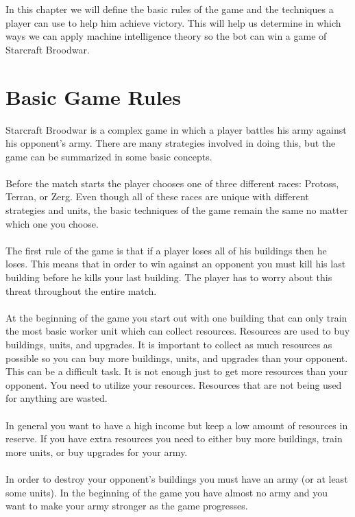 In this chapter we will define the basic rules of the game and the techniques a player can use to help him achieve victory.
This will help us determine in which ways we can apply machine intelligence theory so the bot can win a game of Starcraft Broodwar. 

\section{Basic Game Rules}
	Starcraft Broodwar is a complex game in which a player battles his army against his opponent's army. 
	There are many strategies involved in doing this, but the game can be summarized in some basic concepts.
\\
\\
	Before the match starts the player chooses one of three different races: Protoss, Terran, or Zerg. 
	Even though all of these races are unique with different strategies and units, 
	the basic techniques of the game remain the same no matter which one you choose.
\\
\\	
	The first rule of the game is that if a player loses all of his buildings then he loses. 
	This means that in order to win against an opponent you must kill his last building before he kills your last building. The player has to worry about this threat throughout the entire match.
\\
\\	
	At the beginning of the game you start out with one building that can only train the most basic worker unit which can collect resources. 
	Resources are used to buy buildings, units, and upgrades. 
	It is important to collect as much resources as possible so you can buy more buildings, units, and upgrades than your opponent.
	This can be a difficult task. It is not enough just to get more resources than your opponent. 
	You need to utilize your resources. Resources that are not being used for anything are wasted.
\\
\\ 
	In general you want to have a high income but keep a low amount of resources in reserve. 
	If you have extra resources you need to either buy more buildings, train more units, or buy upgrades for your army.\\
\\
	In order to destroy your opponent's buildings you must have an army (or at least some units). 
	In the beginning of the game you have almost no army and you want to make your army stronger as the game progresses. 
